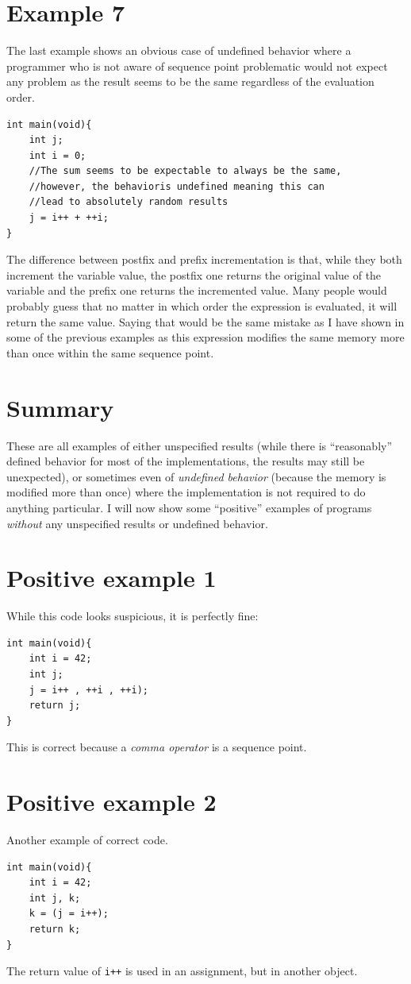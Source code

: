 \section{Example 7}\label{example7}
The last example shows an obvious case of undefined behavior where a programmer who is not aware of sequence point problematic would not expect any problem as the result seems to be the same regardless of the evaluation order.
\begin{lstlisting}
int main(void){
    int j;
    int i = 0;
    //The sum seems to be expectable to always be the same,
    //however, the behavioris undefined meaning this can
    //lead to absolutely random results
    j = i++ + ++i;
}
\end{lstlisting}
The difference between postfix and prefix incrementation is that, while they both increment the variable value, the postfix one returns the original value of the variable and the prefix one returns the incremented value. Many people would probably guess that no matter in which order the expression is evaluated, it will return the same value. Saying that would be the same mistake as I have shown in some of the previous examples as this expression modifies the same memory more than once within the same sequence point.

\section{Summary}
These are all examples of either unspecified results (while there is ``reasonably'' defined behavior for most of the implementations, the results may still be unexpected), or sometimes even of \emph{undefined behavior} (because the memory is modified more than once) where the implementation is not required to do anything particular. I will now show some ``positive'' examples of programs \emph{without} any unspecified results or undefined behavior.

\section{Positive example 1}
While this code looks suspicious, it is perfectly fine:
\begin{lstlisting}
int main(void){
    int i = 42;
    int j;
    j = i++ , ++i , ++i);
    return j;
}
\end{lstlisting}
This is correct because a \emph{comma operator} is a sequence point.

\section{Positive example 2}
Another example of correct code.
\begin{lstlisting}
int main(void){
    int i = 42;
    int j, k;
    k = (j = i++);
    return k;
}
\end{lstlisting}
The return value of \verb|i++| is used in an assignment, but in another object.

